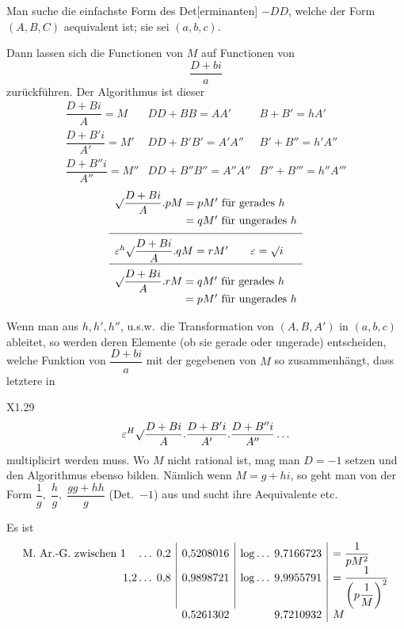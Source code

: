 \par\indent Man suche die einfachste Form des Det[erminanten] \(-DD\), welche der Form \((A,B,C)\) aequivalent ist; sie sei \((a,b,c)\).
\par\indent Dann lassen sich die Functionen von \(M\) auf Functionen von
\[\frac{D+bi}a\]
\noindent zurückführen. Der Algorithmus ist dieser
{\small\setlength{\arraycolsep}{8pt}
\[\begin{array}{lll}
\dfrac{D+Bi}A=M&DD+BB=AA'&B+B'=hA'\\[.9em]
\dfrac{D+B'i}{A'}=M'&DD+B'B'=A'A''&B'+B''=h'A''\\[.9em]
\dfrac{D+B''i}{A''}=M''&DD+B''B''=A''A''&B''+B'''=h''A'''
\end{array}\]}
\[\begin{array}{l}
\surd\dfrac{D+Bi}A.pM=pM'\text{ für gerades }h\\[.4em]
\hphantom{\surd\dfrac{D+Bi}A.pM}{}=qM'\text{ für ungerades }h\\[.5em]\hline\noalign{\vskip.5em}
\varepsilon^h\surd\dfrac{D+Bi}A.qM=rM'\qquad\varepsilon=\surd i\\[.5em]\hline\noalign{\vskip.5em}
\surd\dfrac{D+Bi}A.rM=qM'\text{ für gerades }h\\[.4em]
\hphantom{\surd\dfrac{D+Bi}A.rM}{}=pM'\text{ für ungerades }h
\end{array}\]
\par\indent Wenn man aus \(h,h',h''\), u.s.w.\ die Transformation von \((A,B,A')\) in \((a,b,c)\) ableitet, so werden deren Elemente (ob sie gerade oder ungerade) entscheiden, welche Funktion von \(\dfrac{D+bi}a\) mit der gegebenen von \(M\) so zusammenhängt, dass letztere in
\par\bigskip\noindent\small X1.\hfill29\normalsize
\clearpage{}
\[\varepsilon^H\surd\frac{D+Bi}A.\frac{D+B'i}{A'}.\frac{D+B''i}{A''}\ldots\]
\noindent multiplicirt werden muss. Wo \(M\) nicht rational ist, mag man \(D=-1\) setzen und den Algorithmus ebenso bilden. Nämlich wenn \(M=g+hi\), so geht man von der Form \(\dfrac1g,\;\dfrac hg,\;\dfrac{gg+hh}g\) (Det.\ \(-1\)) aus und sucht ihre Aequivalente etc.
\par\indent Es ist
{\footnotesize\setlength{\arraycolsep}{4pt}\renewcommand{\arraystretch}{1.65}
\[\begin{array}{r|r|r|l}
\text{M. Ar.-G. zwischen }1\quad\ldots\;0{,}2&0{,}5208016&\log\ldots\;9{,}7166723&=\dfrac1{pM^2}\\
1{,}2\ldots\;0{,}8&0{,}9898721&\log\ldots\;9{,}9955791&=\dfrac1{\left(p\dfrac1M\right)^2}\\
\multicolumn{1}{r}{}&\multicolumn{1}{r}{0{,}5261302}&9{,}7210932&M
\end{array}\]}

